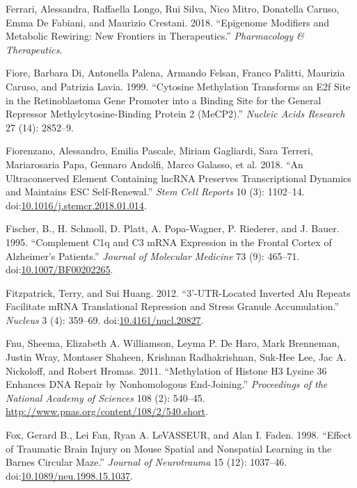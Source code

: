 \documentclass[onehalf,12pt]{beavtex}
\begin{document}
  \hypertarget{ref-FerrariEpigenomemodifiersmetabolic2018}{}
  Ferrari, Alessandra, Raffaella Longo, Rui Silva, Nico Mitro, Donatella
  Caruso, Emma De Fabiani, and Maurizio Crestani. 2018. ``Epigenome
  Modifiers and Metabolic Rewiring: New Frontiers in Therapeutics.''
  \emph{Pharmacology \& Therapeutics}.
  
  \hypertarget{ref-FioreCytosinemethylationtransforms1999}{}
  Fiore, Barbara Di, Antonella Palena, Armando Felsan, Franco Palitti,
  Maurizia Caruso, and Patrizia Lavia. 1999. ``Cytosine Methylation
  Transforms an E2f Site in the Retinoblastoma Gene Promoter into a
  Binding Site for the General Repressor Methylcytosine-Binding Protein 2
  (MeCP2).'' \emph{Nucleic Acids Research} 27 (14): 2852--9.
  
  \hypertarget{ref-FiorenzanoUltraconservedElementContaining2018}{}
  Fiorenzano, Alessandro, Emilia Pascale, Miriam Gagliardi, Sara Terreri,
  Mariarosaria Papa, Gennaro Andolfi, Marco Galasso, et al. 2018. ``An
  Ultraconserved Element Containing lncRNA Preserves Transcriptional
  Dynamics and Maintains ESC Self-Renewal.'' \emph{Stem Cell Reports} 10
  (3): 1102--14.
  doi:\href{https://doi.org/10.1016/j.stemcr.2018.01.014}{10.1016/j.stemcr.2018.01.014}.
  
  \hypertarget{ref-FischerComplementC1qC31995}{}
  Fischer, B., H. Schmoll, D. Platt, A. Popa-Wagner, P. Riederer, and J.
  Bauer. 1995. ``Complement C1q and C3 mRNA Expression in the Frontal
  Cortex of Alzheimer's Patients.'' \emph{Journal of Molecular Medicine}
  73 (9): 465--71.
  doi:\href{https://doi.org/10.1007/BF00202265}{10.1007/BF00202265}.
  
  \hypertarget{ref-FitzpatrickUTRlocatedinvertedAlu2012}{}
  Fitzpatrick, Terry, and Sui Huang. 2012. ``3'-UTR-Located Inverted Alu
  Repeats Facilitate mRNA Translational Repression and Stress Granule
  Accumulation.'' \emph{Nucleus} 3 (4): 359--69.
  doi:\href{https://doi.org/10.4161/nucl.20827}{10.4161/nucl.20827}.
  
  \hypertarget{ref-FnuMethylationhistoneH32011}{}
  Fnu, Sheema, Elizabeth A. Williamson, Leyma P. De Haro, Mark Brenneman,
  Justin Wray, Montaser Shaheen, Krishnan Radhakrishnan, Suk-Hee Lee, Jac
  A. Nickoloff, and Robert Hromas. 2011. ``Methylation of Histone H3
  Lysine 36 Enhances DNA Repair by Nonhomologous End-Joining.''
  \emph{Proceedings of the National Academy of Sciences} 108 (2): 540--45.
  \url{http://www.pnas.org/content/108/2/540.short}.
  
  \hypertarget{ref-FoxEffectTraumaticBrain1998}{}
  Fox, Gerard B., Lei Fan, Ryan A. LeVASSEUR, and Alan I. Faden. 1998.
  ``Effect of Traumatic Brain Injury on Mouse Spatial and Nonspatial
  Learning in the Barnes Circular Maze.'' \emph{Journal of Neurotrauma} 15
  (12): 1037--46.
  doi:\href{https://doi.org/10.1089/neu.1998.15.1037}{10.1089/neu.1998.15.1037}.
  
\end{document}
